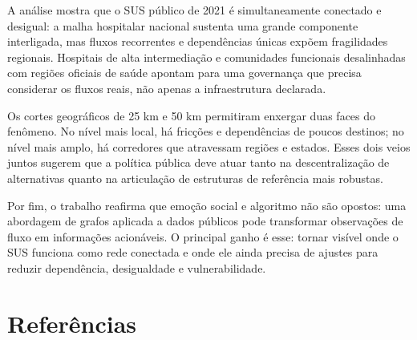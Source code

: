 \documentclass[10pt,a4paper]{article}
\begin{document}
A análise mostra que o SUS público de 2021 é simultaneamente conectado e desigual: a malha hospitalar nacional sustenta uma grande componente interligada, mas fluxos recorrentes e dependências únicas expõem fragilidades regionais. Hospitais de alta intermediação e comunidades funcionais desalinhadas com regiões oficiais de saúde apontam para uma governança que precisa considerar os fluxos reais, não apenas a infraestrutura declarada.

Os cortes geográficos de 25 km e 50 km permitiram enxergar duas faces do fenômeno. No nível mais local, há fricções e dependências de poucos destinos; no nível mais amplo, há corredores que atravessam regiões e estados. Esses dois veios juntos sugerem que a política pública deve atuar tanto na descentralização de alternativas quanto na articulação de estruturas de referência mais robustas.

Por fim, o trabalho reafirma que emoção social e algoritmo não são opostos: uma abordagem de grafos aplicada a dados públicos pode transformar observações de fluxo em informações acionáveis. O principal ganho é esse: tornar visível onde o SUS funciona como rede conectada e onde ele ainda precisa de ajustes para reduzir dependência, desigualdade e vulnerabilidade.

\section{Referências}

\nocite{*}


\end{document}
